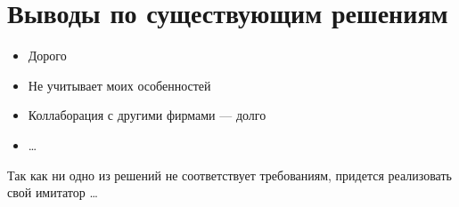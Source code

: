 \section{Выводы по существующим решениям}

\begin{itemize}
    \item Дорого
    \item Не учитывает моих особенностей
    \item Коллаборация с другими фирмами --- долго
    \item \ldots
\end{itemize}


Так как ни одно из решений не соответствует требованиям, придется реализовать свой
имитатор \ldots
